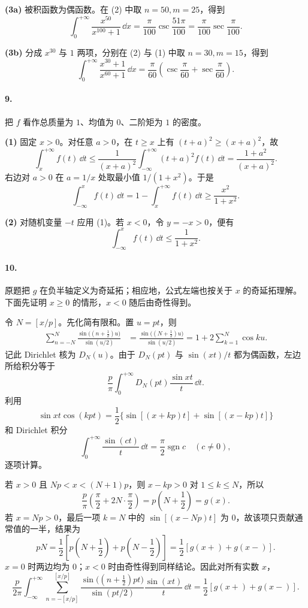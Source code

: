 \textbf{(3a)} 被积函数为偶函数。在 (2) 中取 $n=50,m=25$，得到
\[
  \boxed{\int_0^{+\infty}\frac{x^{50}}{x^{100}+1}\,\dd x
  =\frac\pi{100}\operatorname{csc}\frac{51\pi}{100}
  =\frac\pi{100}\sec\frac\pi{100}}.
\]

\textbf{(3b)} 分成 $x^{30}$ 与 $1$ 两项，分别在 (2) 与 (1) 中取 $n=30,m=15$，得到
\[
  \boxed{\int_0^{+\infty}\frac{x^{30}+1}{x^{60}+1}\,\dd x
  =\frac\pi{60}\left(
  \operatorname{csc}\frac\pi{60}+\sec\frac\pi{60}
  \right)}.
\]

\paragraph{9.}
把 $f$ 看作总质量为 $1$、均值为 $0$、二阶矩为 $1$ 的密度。

\textbf{(1)} 固定 $x>0$。对任意 $a>0$，在 $t\geq x$ 上有 $(t+a)^2\geq(x+a)^2$，故
\[
  \int_x^{+\infty}f(t)\,\dd t
  \leq\frac1{(x+a)^2}\int_{-\infty}^{+\infty}(t+a)^2f(t)\,\dd t
  =\frac{1+a^2}{(x+a)^2}.
\]
右边对 $a>0$ 在 $a=1/x$ 处取最小值 $1/(1+x^2)$。于是
\[
  \int_{-\infty}^x f(t)\,\dd t
  =1-\int_x^{+\infty}f(t)\,\dd t
  \geq\boxed{\frac{x^2}{1+x^2}}.
\]

\textbf{(2)} 对随机变量 $-t$ 应用 (1)。若 $x<0$，令 $y=-x>0$，便有
\[
  \int_{-\infty}^{x}f(t)\,\dd t
  \leq\boxed{\frac1{1+x^2}}.
\]

\paragraph{10.}
原题把 $g$ 在负半轴定义为奇延拓；相应地，公式左端也按关于 $x$ 的奇延拓理解。下面先证明 $x\geq0$ 的情形，$x<0$ 随后由奇性得到。

令 $N=[x/p]$。先化简有限和。置 $u=pt$，则
\begin{align*}
  \sum_{n=-N}^{N}\frac{\sin\bigl((n+\frac12)u\bigr)}{\sin(u/2)}
  &=\frac{\sin\bigl((N+\frac12)u\bigr)}{\sin(u/2)}
  =1+2\sum_{k=1}^{N}\cos ku.
\end{align*}
记此 Dirichlet 核为 $D_N(u)$。由于 $D_N(pt)$ 与 $\sin(xt)/t$ 都为偶函数，左边所给积分等于
\[
  \frac p\pi\int_0^{+\infty}D_N(pt)\frac{\sin xt}{t}\,\dd t.
\]
利用
\[
  \sin xt\cos(kpt)
  =\frac12\{\sin[(x+kp)t]+\sin[(x-kp)t]\}
\]
和 Dirichlet 积分
\[
  \int_0^{+\infty}\frac{\sin(ct)}t\,\dd t
  =\frac\pi2\operatorname{sgn}c
  \quad(c\ne0),
\]
逐项计算。

若 $x>0$ 且 $Np<x<(N+1)p$，则 $x-kp>0$ 对 $1\leq k\leq N$，所以
\[
  \frac p\pi\left(\frac\pi2+2N\cdot\frac\pi2\right)
  =p\left(N+\frac12\right)=g(x).
\]
若 $x=Np>0$，最后一项 $k=N$ 中的 $\sin[(x-Np)t]$ 为 $0$，故该项只贡献通常值的一半，结果为
\[
  pN=\frac12\left[p\left(N+\frac12\right)+p\left(N-\frac12\right)\right]
  =\frac12[g(x+)+g(x-)].
\]
$x=0$ 时两边均为 $0$；$x<0$ 时由奇性得到同样结论。因此对所有实数 $x$，
\[
  \boxed{
  \frac{p}{2\pi}\int_{-\infty}^{+\infty}
  \sum_{n=-[x/p]}^{[x/p]}
  \frac{\sin\bigl((n+\frac12)pt\bigr)}{\sin(pt/2)}\frac{\sin(xt)}{t}\,\dd t
  =\frac12[g(x+)+g(x-)].}
\]
